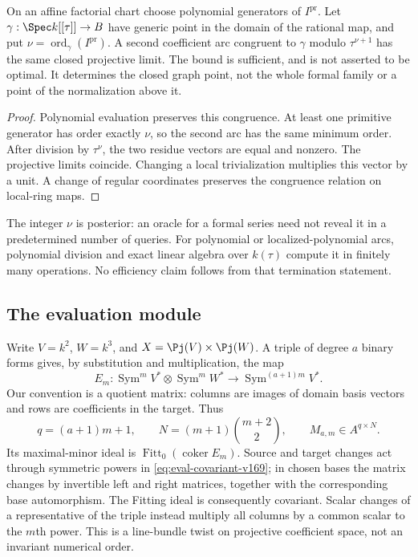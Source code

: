 \begin{proposition}\label{prop:primitive-jet-v169}
On an affine factorial chart choose polynomial generators of
$I^{\mathrm{pr}}$. Let $\gamma:\Spec k[[\tau]]\to B$ have generic
point in the domain of the rational map, and put
$\nu=\operatorname{ord}_\gamma(I^{\mathrm{pr}})$. A second coefficient
arc congruent to $\gamma$ modulo $\tau^{\nu+1}$ has the same closed
projective limit. The bound is sufficient, and is not asserted to be
optimal. It determines the closed graph point, not the whole formal
family or a point of the normalization above it.
\end{proposition}
\begin{proof}
Polynomial evaluation preserves this congruence. At least one primitive
generator has order exactly $\nu$, so the second arc has the same
minimum order. After division by $\tau^\nu$, the two residue vectors
are equal and nonzero. The projective limits coincide. Changing a local
trivialization multiplies this vector by a unit. A change of regular
coordinates preserves the congruence relation on local-ring maps.
\end{proof}
The integer $\nu$ is posterior: an oracle for a formal series need not
reveal it in a predetermined number of queries. For polynomial or
localized-polynomial arcs, polynomial division and exact linear algebra
over $k(\tau)$ compute it in finitely many operations. No efficiency
claim follows from that termination statement.

\subsection{The evaluation module}
Write $V=k^2$, $W=k^3$, and $X=\Pj(V)\times\Pj(W)$. A triple of degree
$a$ binary forms gives, by substitution and multiplication, the map
\begin{equation}\label{eq:eval-covariant-v169}
 E_m:\operatorname{Sym}^m V^*\otimes\operatorname{Sym}^m W^*
       \longrightarrow\operatorname{Sym}^{(a+1)m}V^*.
\end{equation}
Our convention is a quotient matrix: columns are images of domain basis
vectors and rows are coefficients in the target. Thus
\[
 q=(a+1)m+1,\qquad N=(m+1)\binom{m+2}{2},\qquad M_{a,m}\in A^{q\times N}.
\]
Its maximal-minor ideal is $\operatorname{Fitt}_0(\operatorname{coker}E_m)$.
Source and target changes act through symmetric powers in
\eqref{eq:eval-covariant-v169}; in chosen bases the matrix changes by
invertible left and right matrices, together with the corresponding
base automorphism. The Fitting ideal is consequently covariant. Scalar
changes of a representative of the triple instead multiply all columns
by a common scalar to the $m$th power. This is a line-bundle twist on
projective coefficient space, not an invariant numerical order.

